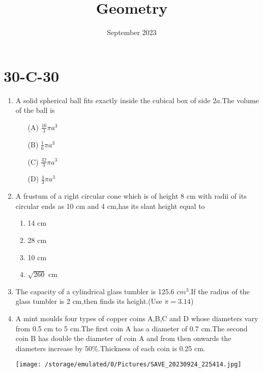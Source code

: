 \documentclass[15pt]{article}
\title{Geometry}
\date{September 2023}
\begin{document}
\maketitle
\section{30-C-30}
\begin{enumerate}

 \item A solid spherical ball fits exactly inside the cubical box of side 2$a$.The volume of the ball is
     \begin{enumerate}
         \item[(A)] $\frac{16}{3}{\pi a^3}$
         \item[(B)] $\frac{1}{6}{\pi a^3}$
         \item [(C)]$\frac{32}{3}{\pi a^3}$
          \item [(D)]$\frac{4}{3}{\pi a^3}$
     \end{enumerate}
  \item A frustum of a right circular cone which is of height 8 cm with radii of its circular ends as 10 cm and 4 cm,has its slant height equal to
       \begin{enumerate}
           \item 14 cm
           \item 28 cm
           \item 10 cm
           \item $\sqrt{260}$ cm
        \end{enumerate}
 \item The capacity of a cylindrical glass tumbler is 125.6 $cm^3$.If the radius of the glass tumbler is 2 cm,then finds its height.(Use $\pi=3.14$)
 \item A mint moulds four types of copper coins A,B,C and D whose diameters
 vary from 0.5 cm to 5 cm.The first coin A has a diameter of 0.7 cm.The second coin B has double the diameter of coin A and from then onwards the diameters increase by 50\%.Thickness of each coin is 0.25 cm.
     \begin{center}
         \texttt{[image:    /storage/emulated/0/Pictures/SAVE\_20230924\_225414.jpg]}
     \end{center}
     
   

\end{enumerate}
\end{document}
